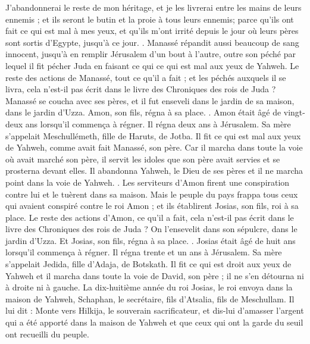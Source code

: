 \begin{multicols}{2}
J'abandonnerai le reste de mon héritage, et je les livrerai entre les mains de leurs ennemis ; et ils seront le butin et la proie à tous leurs ennemis;
parce qu'ils ont fait ce qui est mal à mes yeux, et qu'ils m'ont irrité depuis le jour où leurs pères sont sortis d'Egypte, jusqu'à ce jour.
.
Manassé répandit aussi beaucoup de sang innocent, jusqu'à en remplir Jérusalem d'un bout à l'autre, outre son péché par lequel il fit pécher Juda en faisant ce qui ce qui est mal aux yeux de Yahweh.
Le reste des actions de Manassé, tout ce qu'il a fait ; et les péchés auxquels il se livra, cela n'est-il pas écrit dans le livre des Chroniques des rois de Juda ?
Manassé se coucha avec ses pères, et il fut enseveli dans le jardin de sa maison, dans le jardin d'Uzza. Amon, son fils, régna à sa place.
.
Amon était âgé de vingt-deux ans lorsqu'il commença à régner. Il régna deux ans à Jérusalem. Sa mère s'appelait Meschullémeth, fille de Haruts, de Jotba.
Il fit ce qui est mal aux yeux de Yahweh, comme avait fait Manassé, son père.
Car il marcha dans toute la voie où avait marché son père, il servit les idoles que son père avait servies et se prosterna devant elles.
Il abandonna Yahweh, le Dieu de ses pères et il ne marcha point dans la voie de Yahweh.
.
Les serviteurs d'Amon firent une conspiration contre lui et le tuèrent dans sa maison.
Mais le peuple du pays frappa tous ceux qui avaient conspiré contre le roi Amon ; et ils établirent Josias, son fils, roi à sa place.
Le reste des actions d'Amon, ce qu'il a fait, cela n'est-il pas écrit dans le livre des Chroniques des rois de Juda ?
On l'ensevelit dans son sépulcre, dans le jardin d'Uzza. Et Josias, son fils, régna à sa place.
.
\VerseOne{}Josias était âgé de huit ans lorsqu'il commença à régner. Il régna trente et un ans à Jérusalem. Sa mère s'appelait Jedida, fille d'Adaja, de Botskath.
Il fit ce qui est droit aux yeux de Yahweh et il marcha dans toute la voie de David, son père ; il ne s'en détourna ni à droite ni à gauche.
La dix-huitième année du roi Josias, le roi envoya dans la maison de Yahweh, Schaphan, le secrétaire, fils d'Atsalia, fils de Meschullam.
Il lui dit : Monte vers Hilkija, le souverain sacrificateur, et dis-lui d'amasser l'argent qui a été apporté dans la maison de Yahweh et que ceux qui ont la garde du seuil ont recueilli du peuple.

\end{multicols}
